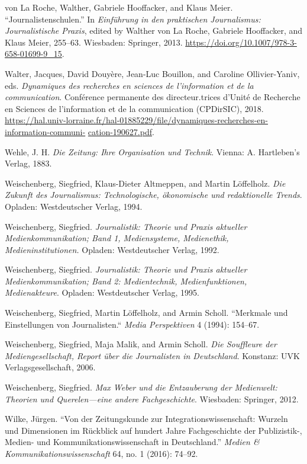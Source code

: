 \documentclass{tufte-handout}
\begin{document}
\begin{hangparas}{.25in}{1}
von La Roche, Walther, Gabriele Hooffacker, and Klaus Meier.
``Journalistenschulen.'' In \emph{Einführung in den praktischen
Journalismus: Journalistische Praxis}, edited by Walther von La Roche,
Gabriele Hooffacker, and Klaus Meier, 255--63. Wiesbaden: Springer,
2013. \url{https://doi.org/10.1007/978-3-658-01699-9_15}.

Walter, Jacques, David Douyère, Jean-Luc Bouillon, and Caroline
Ollivier-Yaniv, eds. \emph{Dynamiques des recherches en sciences de
l'information et de la communication}. Conférence permanente des
directeur.trices d'Unité de Recherche en Sciences de l'information et de
la communication (CPDirSIC), 2018.
\href{https://hal.univ-lorraine.fr/hal-01885229/file/dynamiques-recherches-en-information-communication-190627.pdf}{https://hal.univ-lorraine.fr/hal-01885229/file/dynamiques-recherches-en-information-communi-} \href{https://hal.univ-lorraine.fr/hal-01885229/file/dynamiques-recherches-en-information-communication-190627.pdf}{cation-190627.pdf}.

Wehle, J. H. \emph{Die Zeitung: Ihre Organisation und Technik}. Vienna:
A. Hartleben's Verlag, 1883.

Weischenberg, Siegfried, Klaus-Dieter Altmeppen, and Martin Löffelholz.
\emph{Die Zukunft des Journalismus: Technologische, ökonomische und
redaktionelle Trends}. Opladen: Westdeutscher Verlag, 1994.

Weischenberg, Siegfried. \emph{Journalistik: Theorie und Praxis
aktueller Medienkommunikation; Band 1, Mediensysteme, Medienethik,
Medieninstitutionen.} Opladen: Westdeutscher Verlag, 1992.

Weischenberg, Siegfried. \emph{Journalistik: Theorie und Praxis
aktueller Medienkommunikation; Band 2: Medientechnik, Medienfunktionen,
Medienakteure}. Opladen: Westdeutscher Verlag, 1995.

Weischenberg, Siegfried, Martin Löffelholz, and Armin Scholl. ``Merkmale
und Einstellungen von Journalisten.`` \emph{Media Perspektiven} 4
(1994): 154--67.

Weischenberg, Siegfried, Maja Malik, and Armin Scholl. \emph{Die
Souffleure der Mediengesellschaft, Report über die Journalisten in
Deutschland}. Konstanz: UVK Verlagsgesellschaft, 2006.

Weischenberg, Siegfried. \emph{Max Weber und die Entzauberung der
Medienwelt: Theorien und Querelen---eine andere Fachgeschichte}.
Wiesbaden: Springer, 2012.

Wilke, Jürgen. ``Von der Zeitungskunde zur Integrationswissenschaft:
Wurzeln und Dimensionen im Rückblick auf hundert Jahre Fachgeschichte
der Publizistik-, Medien- und Kommunikationswissenschaft in
Deutschland.'' \emph{Medien \& Kommunikationswissenschaft} 64, no. 1
(2016): 74--92.



\end{hangparas}
\end{document}
